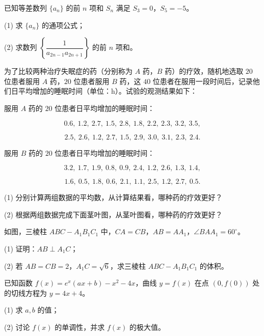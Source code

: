 \begin{question}
已知等差数列 $\{a_n\}$ 的前 $n$ 项和 $S_n$ 满足 $S_3=0$，$S_5=-5$。

(1) 求 $\{a_n\}$ 的通项公式；

(2) 求数列 $\left\{\dfrac{1}{a_{2n-1}a_{2n+1}}\right\}$ 的前 $n$ 项和。

\Needspace{0.4\textheight}
\end{question}
\begin{question}
为了比较两种治疗失眠症的药（分别称为 $A$ 药，$B$ 药）的疗效，随机地选取 $20$ 位患者服用 $A$ 药，$20$ 位患者服用 $B$ 药，这 $40$ 位患者在服用一段时间后，记录他们日平均增加的睡眠时间（单位：h）。试验的观测结果如下：

服用 $A$ 药的 $20$ 位患者日平均增加的睡眠时间：

\nopagebreak[4]
\[
0.6,\ 1.2,\ 2.7,\ 1.5,\ 2.8,\ 1.8,\ 2.2,\ 2.3,\ 3.2,\ 3.5,
\]

\nopagebreak[4]
\[
2.5,\ 2.6,\ 1.2,\ 2.7,\ 1.5,\ 2.9,\ 3.0,\ 3.1,\ 2.3,\ 2.4.
\]

服用 $B$ 药的 $20$ 位患者日平均增加的睡眠时间：

\nopagebreak[4]
\[
3.2,\ 1.7,\ 1.9,\ 0.8,\ 0.9,\ 2.4,\ 1.2,\ 2.6,\ 1.3,\ 1.4,
\]

\nopagebreak[4]
\[
1.6,\ 0.5,\ 1.8,\ 0.6,\ 2.1,\ 1.1,\ 2.5,\ 1.2,\ 2.7,\ 0.5.
\]

(1) 分别计算两组数据的平均数，从计算结果看，哪种药的疗效更好？

(2) 根据两组数据完成下面茎叶图，从茎叶图看，哪种药的疗效更好？
\nopagebreak[4]
\begin{center}\end{center}
\nopagebreak[4]
\Needspace{0.4\textheight}
\end{question}
\begin{question}
如图，三棱柱 $ABC-A_1B_1C_1$ 中，$CA=CB$，$AB=AA_1$，$\angle BAA_1=60^\circ$。
\nopagebreak[4]
\begin{center}\end{center}
\nopagebreak[4]
(1) 证明：$AB\perp A_1C$；

(2) 若 $AB=CB=2$，$A_1C=\sqrt6$，求三棱柱 $ABC-A_1B_1C_1$ 的体积。

\end{question}
\begin{question}
已知函数 $f(x)=e^x(ax+b)-x^2-4x$，曲线 $y=f(x)$ 在点 $(0,f(0))$ 处的切线方程为 $y=4x+4$。

(1) 求 $a,b$ 的值；

(2) 讨论 $f(x)$ 的单调性，并求 $f(x)$ 的极大值。

\end{question}
